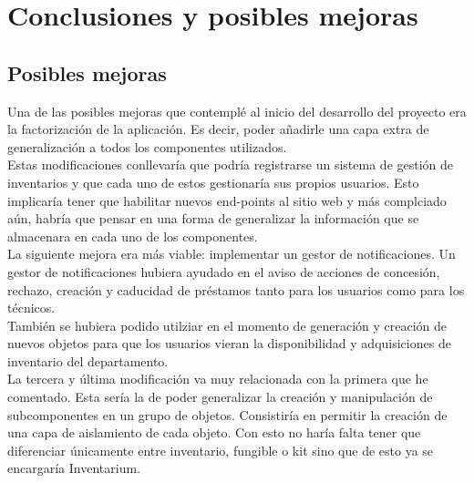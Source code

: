 \chapter{Conclusiones y posibles mejoras}
\section{Posibles mejoras}
Una de las posibles mejoras que contemplé al inicio del desarrollo del proyecto era la factorización de la aplicación. Es decir, poder añadirle una capa extra de generalización a todos los componentes utilizados.
\\Estas modificaciones conllevaría que podría registrarse un sistema de gestión de inventarios y que cada uno de estos gestionaría sus propios usuarios. Esto implicaría tener que habilitar nuevos end-points al sitio web y más complciado aún, habría que pensar en una forma de generalizar la información que se almacenara en cada uno de los componentes.
\\La siguiente mejora era más viable: implementar un gestor de notificaciones. Un gestor de notificaciones hubiera ayudado en el aviso de acciones de concesión, rechazo, creación y caducidad de préstamos tanto para los usuarios como para los técnicos.
\\También se hubiera podido utilziar en el momento de generación y creación de nuevos objetos para que los usuarios vieran la disponibilidad y adquisiciones de inventario del departamento.
\\La tercera y última modificación va muy relacionada con la primera que he comentado. Esta sería la de poder generalizar la creación y manipulación de subcomponentes en un grupo de objetos. Consistiría en permitir la creación de una capa de aislamiento de cada objeto. Con esto no haría falta tener que diferenciar únicamente entre inventario, fungible o kit sino que de esto ya se encargaría Inventarium.
